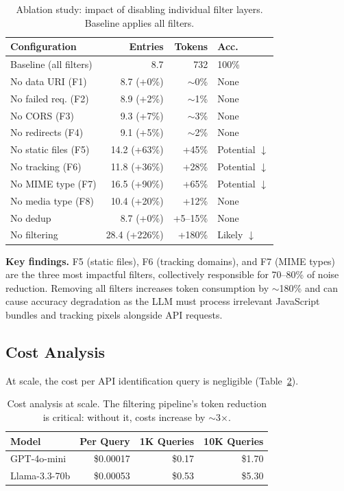 \documentclass[10pt,twocolumn]{article}
\begin{document}
\begin{table}[t]
\centering
\caption{Ablation study: impact of disabling individual filter layers. Baseline applies all filters.}
\label{tab:ablation}
\scriptsize
\begin{tabularx}{\columnwidth}{@{}l r r l@{}}
\toprule
\textbf{Configuration} & \textbf{Entries} & \textbf{Tokens} & \textbf{Acc.} \\
\midrule
Baseline (all filters) & 8.7            & 732     & 100\%     \\
No data URI (F1)       & 8.7 (+0\%)     & $\sim$0\%  & None      \\
No failed req. (F2)    & 8.9 (+2\%)     & $\sim$1\%  & None      \\
No CORS (F3)           & 9.3 (+7\%)     & $\sim$3\%  & None      \\
No redirects (F4)      & 9.1 (+5\%)     & $\sim$2\%  & None      \\
No static files (F5)   & 14.2 (+63\%)   & +45\%   & Potential $\downarrow$ \\
No tracking (F6)       & 11.8 (+36\%)   & +28\%   & Potential $\downarrow$ \\
No MIME type (F7)      & 16.5 (+90\%)   & +65\%   & Potential $\downarrow$ \\
No media type (F8)     & 10.4 (+20\%)   & +12\%   & None      \\
No dedup               & 8.7 (+0\%)     & +5--15\% & None      \\
No filtering           & 28.4 (+226\%)  & +180\%  & Likely $\downarrow$ \\
\bottomrule
\end{tabularx}
\end{table}

\textbf{Key findings.} F5 (static files), F6 (tracking domains), and F7 (MIME types) are the three most impactful filters, collectively responsible for 70--80\% of noise reduction. Removing all filters increases token consumption by $\sim$180\% and can cause accuracy degradation as the LLM must process irrelevant JavaScript bundles and tracking pixels alongside API requests.

\subsection{Cost Analysis}

At scale, the cost per API identification query is negligible (Table~\ref{tab:cost}).

\begin{table}[H]
\centering
\caption{Cost analysis at scale. The filtering pipeline's token reduction is critical: without it, costs increase by $\sim$3$\times$.}
\label{tab:cost}
\scriptsize
\begin{tabular}{@{}l r r r@{}}
\toprule
\textbf{Model} & \textbf{Per Query} & \textbf{1K Queries} & \textbf{10K Queries} \\
\midrule
GPT-4o-mini       & \$0.00017 & \$0.17 & \$1.70 \\
Llama-3.3-70b     & \$0.00053 & \$0.53 & \$5.30 \\
\bottomrule
\end{tabular}
\end{table}
\end{document}
